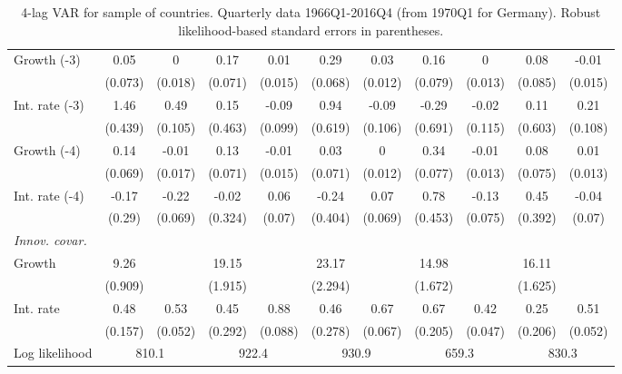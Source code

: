 \begin{table}[htbp]
\begin{tabular}{@{\extracolsep{4pt}}lcccccccccc@{}}
\quad Growth (-3) 	 &0.05 	 & 0 	 & 0.17 	 & 0.01 	 & 0.29 	 & 0.03 	 & 0.16 	 & 0 	 & 0.08 	 & -0.01	 \\ 
 		 & (0.073) 	 & (0.018) 	 & (0.071) 	 & (0.015) 	 & (0.068) 	 & (0.012) 	 & (0.079) 	 & (0.013) 	 & (0.085) 	 & (0.015) 	 \\ 
\quad Int. rate (-3) 	 &1.46 	 & 0.49 	 & 0.15 	 & -0.09 	 & 0.94 	 & -0.09 	 & -0.29 	 & -0.02 	 & 0.11 	 & 0.21	 \\ 
 		 & (0.439) 	 & (0.105) 	 & (0.463) 	 & (0.099) 	 & (0.619) 	 & (0.106) 	 & (0.691) 	 & (0.115) 	 & (0.603) 	 & (0.108) 	 \\ 
\quad Growth (-4) 	 &0.14 	 & -0.01 	 & 0.13 	 & -0.01 	 & 0.03 	 & 0 	 & 0.34 	 & -0.01 	 & 0.08 	 & 0.01	 \\ 
 		 & (0.069) 	 & (0.017) 	 & (0.071) 	 & (0.015) 	 & (0.071) 	 & (0.012) 	 & (0.077) 	 & (0.013) 	 & (0.075) 	 & (0.013) 	 \\ 
\quad Int. rate (-4) 	 &-0.17 	 & -0.22 	 & -0.02 	 & 0.06 	 & -0.24 	 & 0.07 	 & 0.78 	 & -0.13 	 & 0.45 	 & -0.04	 \\ 
 		 & (0.29) 	 & (0.069) 	 & (0.324) 	 & (0.07) 	 & (0.404) 	 & (0.069) 	 & (0.453) 	 & (0.075) 	 & (0.392) 	 & (0.07) 	 \\ 
\rule{0pt}{4ex} \emph{Innov. covar.}  	 & 	 & 	 & 	 & 	 & 	 & 	 & 	 & 	 & 	 &\\ 
\quad Growth 	 &9.26 	 &  	 & 19.15 	 &  	 & 23.17 	 &  	 & 14.98 	 &  	 & 16.11 	 & 	 \\ 
 		 & (0.909) 	 &  	 & (1.915) 	 &  	 & (2.294) 	 &  	 & (1.672) 	 &  	 & (1.625) 	 &  	 \\ 
\quad Int. rate 	 &0.48 	 & 0.53 	 & 0.45 	 & 0.88 	 & 0.46 	 & 0.67 	 & 0.67 	 & 0.42 	 & 0.25 	 & 0.51	 \\ 
 		 & (0.157) 	 & (0.052) 	 & (0.292) 	 & (0.088) 	 & (0.278) 	 & (0.067) 	 & (0.205) 	 & (0.047) 	 & (0.206) 	 & (0.052) 	 \\ 
 \hline \rule{0pt}{4ex} 
  Log likelihood 	 &\multicolumn{2}{c}{810.1} 	 & \multicolumn{2}{c}{922.4} 	 & \multicolumn{2}{c}{930.9} 	 & \multicolumn{2}{c}{659.3} 	 & \multicolumn{2}{c}{830.3}\\ 

 \hline 	\end{tabular}		\caption{4-lag VAR for sample of countries. Quarterly data 1966Q1-2016Q4
                      (from 1970Q1 for Germany). Robust likelihood-based
                      standard errors in parentheses.}
		\label{tab:all_4lag}

\end{table}